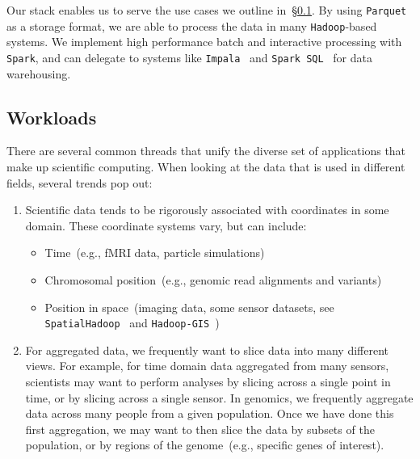 \documentclass{sig-alternate}
\begin{document}
Our stack enables us to serve the use cases we outline in~\S\ref{sec:workloads}. By using
\texttt{Parquet} as a storage format, we are able to process the data in many \texttt{Hadoop}-based systems. We
implement high performance batch and interactive processing with \linebreak \texttt{Spark}, and can delegate to
systems like \texttt{Impala}~\cite{kornacker15} and \texttt{Spark SQL}~\cite{armbrust15} for data warehousing.

\subsection{Workloads}
\label{sec:workloads}

There are several common threads that unify the diverse set of applications that make up scientific
computing. When looking at the data that is used in different fields, several trends pop out:

\begin{enumerate}
\item Scientific data tends to be rigorously associated with coordinates in some domain. These coordinate
systems vary, but can include:
\begin{itemize}
\item Time~(e.g., fMRI data, particle simulations)
\item Chromosomal position~(e.g., genomic read alignments and variants)
\item Position in space~(imaging data, some \linebreak sensor datasets, see \texttt{SpatialHadoop}~\cite{eldawy15}
and \linebreak \texttt{Hadoop-GIS}~\cite{aji13})
\end{itemize}
\item For aggregated data, we frequently want to slice data into many different views. For example, for time
domain data aggregated from many sensors, scientists may want to perform analyses by slicing
across a single point in time, or by slicing across a single sensor. In genomics, we frequently aggregate data
across many people from a given population. Once we have done this first aggregation, we may want to then
slice the data by subsets of the population, or by regions of the genome~(e.g., specific genes of interest).
\end{enumerate}
\end{document}
